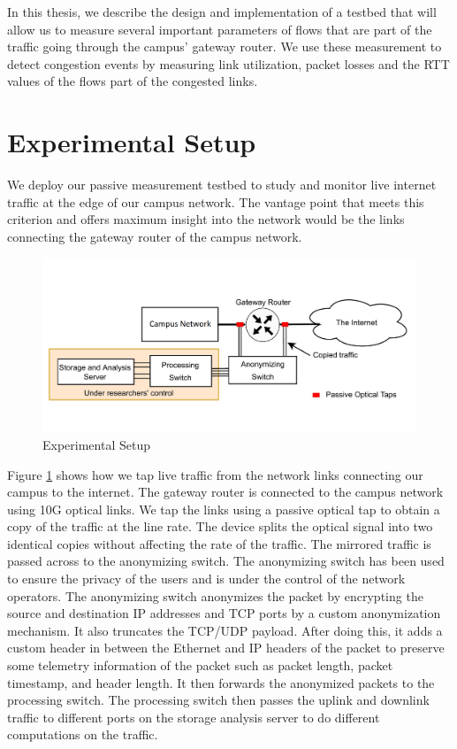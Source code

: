 In this thesis, we describe the design and implementation of a testbed that will allow us to measure several important parameters of flows that are part of the traffic going through the campus' gateway router. We use these measurement to detect congestion events by measuring link utilization, packet losses and the RTT values of the flows part of the congested links.

\section{Experimental Setup}

We deploy our passive measurement testbed to study and monitor live internet traffic at the edge of our campus network. The vantage point that meets this criterion and offers maximum insight into the network would be the links connecting the gateway router of the campus network.

\begin{figure}[t]
    \centering
        \includegraphics[width=\textwidth]{Figures/setup.png}
    \caption[Experimental Setup]{Experimental Setup}
    \label{fig:setup}
    \bigskip
\end{figure}

Figure \ref{fig:setup} shows how we tap live traffic from the network links connecting our campus to the internet. The gateway router is connected to the campus network using 10G optical links. We tap the links using a passive optical tap to obtain a copy of the traffic at the line rate. The device splits the optical signal into two identical copies without affecting the rate of the traffic. The mirrored traffic is passed across to the anonymizing switch. The anonymizing switch has been used to ensure the privacy of the users and is under the control of the network operators. The anonymizing switch anonymizes the packet by encrypting the source and destination IP addresses and TCP ports by a custom anonymization mechanism. It also truncates the TCP/UDP payload. After doing this, it adds a custom header in between the Ethernet and IP headers of the packet to preserve some telemetry information of the packet such as packet length, packet timestamp, and header length. It then forwards the anonymized packets to the processing switch. The processing switch then passes the uplink and downlink traffic to different ports on the storage analysis server to do different computations on the traffic.


